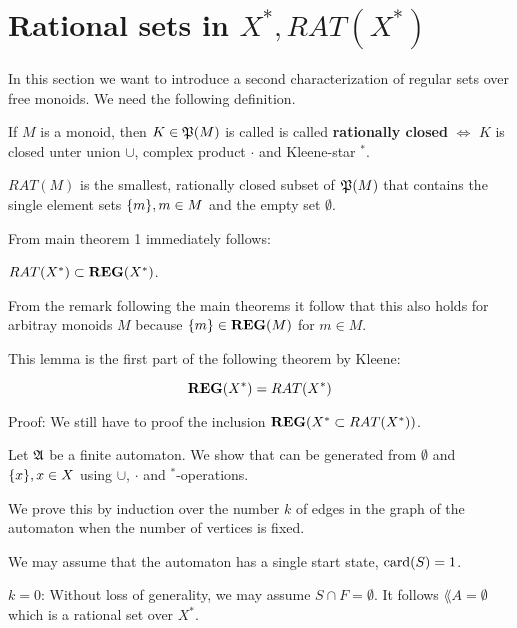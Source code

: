 \section{Rational sets in $X^*, RAT(X^*)$}

In this section we want to introduce a second characterization of regular sets
over free monoids. We need the following definition.

\begin{definition}
If $M$ is a monoid, then $K \in \mathfrak{P}(M)$ is called is called {\bf rationally
closed} $\Leftrightarrow$ $K$ is closed unter union $\cup$, complex product $\cdot$ and Kleene-star $^*$.
\end{definition}

\begin{definition}
$RAT(M)$ is the smallest, rationally closed subset of $\mathfrak{P}(M)$ that
contains the single element sets $\mbox{$\{m\}$}, m \in M$ and the empty set
$\emptyset$.
\end{definition}

From main theorem 1 immediately follows:

\begin{lemma}
$RAT(X^*) \subset \mbox{{\bf REG}}(X^*)$.
\end{lemma}

From the remark following the main theorems it follow that this also holds for
arbitray monoids $M$ because $\mbox{$\{m\}$} \in \mbox{{\bf REG}}(M)$ for $m \in M$.

This lemma is the first part of the following theorem by Kleene:

\begin{theorem}[Kleene]
\[ \mbox{{\bf REG}}(X^*) = RAT(X^*) \]
\end{theorem}

Proof: We still have to proof the inclusion $\mbox{{\bf REG}}(X^* \subset RAT(X^*))$.

Let $\mbox{$\mathfrak{A}$}$ be a finite automaton. We show that  can be generated
from $\emptyset$ and $\mbox{$\{x\}$}, x \in X$	using $\cup$, $\cdot$ and
$^*$-operations.

We prove this by induction over the number $k$ of edges in the graph of the
automaton when the number of vertices is fixed.

We may assume that the automaton has a single start state, $\mathrm{card}(S) = 1$.

$k = 0$: Without loss of generality, we may assume $S \cap F = \emptyset$. It
follows $\lang{A} = \emptyset$ which is a rational set over $X^*$.

